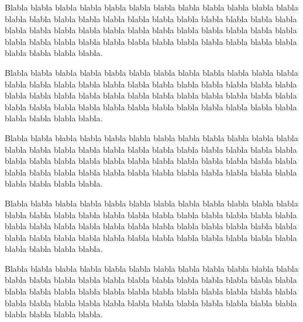 \documentclass{article}
\def\tikztitlebox#1#2{
		\tikzstyle{titlebox}=[color=red,rectangle,inner sep=10pt,inner ysep=10pt,draw]%
		\tikzstyle{title}=[color=red,fill=white]
		\bigskip\noindent\begin{tikzpicture}
		\node[titlebox] (box) {#1};
		\node[title] at (box.north) {#2};
		\end{tikzpicture}
	}
\begin{document}
Blabla blabla blabla blabla blabla blabla blabla blabla blabla blabla blabla blabla blabla
blabla blabla blabla blabla blabla blabla blabla blabla blabla blabla blabla blabla blabla
blabla blabla blabla blabla blabla blabla blabla blabla blabla blabla blabla blabla blabla
blabla blabla blabla blabla blabla blabla blabla blabla blabla blabla blabla blabla blabla.

Blabla blabla blabla blabla blabla blabla blabla blabla blabla blabla blabla blabla blabla
blabla blabla blabla blabla blabla blabla blabla blabla blabla blabla blabla blabla blabla
blabla blabla blabla blabla blabla blabla blabla blabla blabla blabla blabla blabla blabla
blabla blabla blabla blabla blabla blabla blabla blabla blabla blabla blabla blabla blabla.

\begin{theoreme}\label{ici}
Blabla blabla blabla blabla blabla blabla blabla blabla blabla blabla blabla blabla blabla
blabla blabla blabla blabla blabla blabla blabla blabla blabla blabla blabla blabla blabla
blabla blabla blabla blabla blabla blabla blabla blabla blabla blabla blabla blabla blabla
blabla blabla blabla blabla blabla blabla blabla blabla blabla blabla blabla blabla blabla.
\end{theoreme}

Blabla blabla blabla blabla blabla blabla blabla blabla blabla blabla blabla blabla blabla
blabla blabla blabla blabla blabla blabla blabla blabla blabla blabla blabla blabla blabla
blabla blabla blabla blabla blabla blabla blabla blabla blabla blabla blabla blabla blabla
blabla blabla blabla blabla blabla blabla blabla blabla blabla blabla blabla blabla blabla.

\def\tikztitlebox#1#2{
	\tikzstyle{titlebox} = [color=red,fill=red!5, rectangle, inner sep=10pt, inner ysep=10pt,draw]
	\tikzstyle{title}=[text=red,above right,ellipse]
	\bigskip\noindent\begin{tikzpicture}
		\node[titlebox] (box){#1};
		\useasboundingbox (box.south west) rectangle ($ (box.north east) + (0cm,10pt+0.15cm)$);
		\node[title] at ($ (box.north west) + (-1cm,0.15cm)$) {#2};
	\end{tikzpicture}
}%
%
\begin{corollaire}
Blabla blabla blabla blabla blabla blabla blabla blabla blabla blabla blabla blabla blabla
blabla blabla blabla blabla blabla blabla blabla blabla blabla blabla blabla blabla blabla
blabla blabla blabla blabla blabla blabla blabla blabla blabla blabla blabla blabla blabla
blabla blabla blabla blabla blabla blabla blabla blabla blabla blabla blabla blabla blabla.
\end{corollaire}
\end{document}
